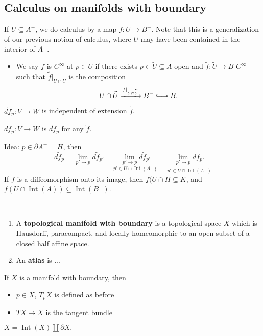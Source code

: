 \subsection{Calculus on manifolds with boundary} 
If $U \subseteq A^-$, we do calculus by a map $f \colon U \to B^-$. Note that this is a generalization of our previous notion of calculus, where $U$ may have been contained in the interior of $A^-$.
\begin{itemize}
    \item We say $f$ is $C^{\infty}$ at $p \in U$ if there exists $p \in \widetilde U\subseteq A$ open and $\widetilde f\colon \widetilde U \to B$ $C^{\infty}$ such that $\widetilde f|_{U\cap \widetilde U}$ is the composition \[
    U\cap \widetilde U \xrightarrow{f|_{U\cap \widetilde U}}  B^- \lhook\joinrel\longrightarrow B.
    \] 
\end{itemize}
\begin{lemma}
    $d \widetilde f_p \colon V \to W$ is independent of extension $\widetilde f$.
\end{lemma}
\begin{definition}[]
    $df_p \colon V \to W$ is $d \widetilde f_p$ for any $\widetilde f$.
\end{definition}
Idea: $p \in \partial A^-=H$, then \[
    d \widetilde f_p = \lim _{p'\to p}d \widetilde f_{p'} = \underset{p' \in U \cap \operatorname{Int}(A^-)}{\underset{p' \to p}{\lim} d \widetilde f_{p'}} = \underset{p' \in \widetilde U \cap \operatorname{Int}(A^-)}{\underset{p' \to p}{\lim} df_p.} 
\] 
If $f $ is a diffeomorphism onto its image, then $f(U \cap H \subseteq K$, and $f (U \cap \operatorname{Int}(A)) \subseteq \operatorname{Int}(B^-)$.
\begin{definition}[]
    \,
    \begin{enumerate}[label=(\arabic*)]
        \item A \textbf{topological manifold with boundary} is a topological space $X$ which is Hausdorff, paracompact, and locally homeomorphic to an open subset of a closed half affine space. 
        \item An \textbf{atlas} is ...
    \end{enumerate}
    If $X$ is a manifold with boundary, then 
    \begin{itemize}
        \item $p \in X$, $T_pX$ is defined as before
        \item $TX \to X$ is the tangent bundle
    \end{itemize}
\end{definition}
$X=\operatorname{Int}(X)\amalg \partial X.$


